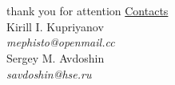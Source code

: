 \documentclass[xcolor=x11names,compress]{beamer}
\renewcommand{\(}{\begin{columns}}
\renewcommand{\)}{\end{columns}}
\newcommand{\<}[1]{\begin{column}{#1}}
\renewcommand{\>}{\end{column}}
\begin{document}
\section{}
\begin{frame}{thank you for attention}
    \underline{Contacts}\\

    \vspace{0.5cm}
    Kirill I. Kupriyanov\\
    \emph{mephisto@openmail.cc}\\

    \vspace{0.3cm}
    Sergey M. Avdoshin\\
    \emph{savdoshin@hse.ru}
\end{frame}
\end{document}
